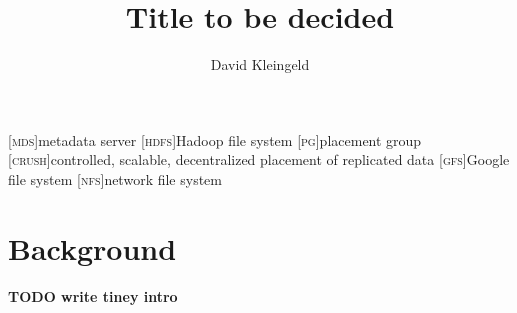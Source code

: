 \documentclass[lang=en, hanging-titles=true]{skrapport}
\title{Title to be decided}
\author{David Kleingeld}
\begin{document}
\begin{titlepage}
\maketitle
\end{titlepage}
\tableofcontents
\clearpage

\newcommand{\n}[1]{\lowercase{\textsc{#1}}}

\begin{acronym}
	[\n{MDS}]{metadata server}
	[\n{HDFS}]{Hadoop file system}
	[\n{PG}]{placement group}
	[\n{CRUSH}]{controlled, scalable, decentralized placement of replicated data}
	[\n{GFS}]{Google file system}
	[\n{NFS}]{network file system}
\end{acronym}


%
\section{Background}
\textbf{TODO write tiney intro}






%
%
%

\clearpage
\appendix
% 
\printbibliography
\end{document}
